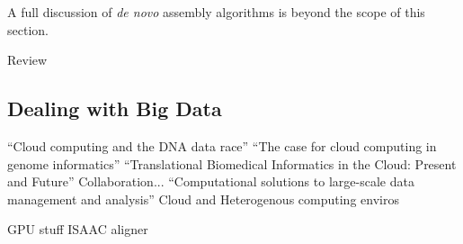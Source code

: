 A full discussion of \emph{de novo} assembly algorithms is beyond the scope of this section.

Review\cite{Nagarajan:2013cq}

\subsection{Dealing with Big Data}

``Cloud computing and the DNA data race''\cite{Schatz:2010js}
``The case for cloud computing in genome informatics''\cite{Stein:2010gp}
``Translational Biomedical Informatics in the Cloud: Present and Future''\cite{Chen:2013ci} Collaboration...
``Computational solutions to large-scale data management and analysis''\cite{Schadt:2010dp} Cloud and Heterogenous computing enviros


GPU stuff
ISAAC aligner~\cite{Raczy:2013hy}